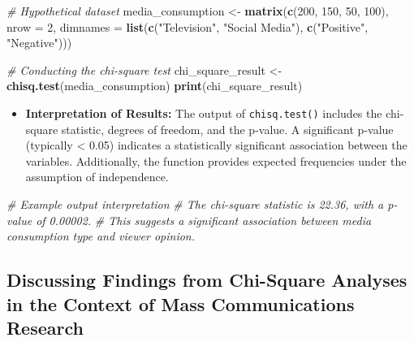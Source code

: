 \documentclass[
]{book}
\newenvironment{Shaded}{\begin{snugshade}}{\end{snugshade}}
\newcommand{\AttributeTok}[1]{\textcolor[rgb]{0.13,0.29,0.53}{#1}}
\newcommand{\CommentTok}[1]{\textcolor[rgb]{0.56,0.35,0.01}{\textit{#1}}}
\newcommand{\DecValTok}[1]{\textcolor[rgb]{0.00,0.00,0.81}{#1}}
\newcommand{\FunctionTok}[1]{\textcolor[rgb]{0.13,0.29,0.53}{\textbf{#1}}}
\newcommand{\NormalTok}[1]{#1}
\newcommand{\OtherTok}[1]{\textcolor[rgb]{0.56,0.35,0.01}{#1}}
\newcommand{\StringTok}[1]{\textcolor[rgb]{0.31,0.60,0.02}{#1}}
\providecommand{\tightlist}{%
  \setlength{\itemsep}{0pt}\setlength{\parskip}{0pt}}
\begin{document}
\begin{Shaded}
\begin{Highlighting}[]
\CommentTok{\# Hypothetical dataset}
\NormalTok{media\_consumption }\OtherTok{\textless{}{-}} \FunctionTok{matrix}\NormalTok{(}\FunctionTok{c}\NormalTok{(}\DecValTok{200}\NormalTok{, }\DecValTok{150}\NormalTok{, }\DecValTok{50}\NormalTok{, }\DecValTok{100}\NormalTok{), }\AttributeTok{nrow =} \DecValTok{2}\NormalTok{,}
                            \AttributeTok{dimnames =} \FunctionTok{list}\NormalTok{(}\FunctionTok{c}\NormalTok{(}\StringTok{"Television"}\NormalTok{, }\StringTok{"Social Media"}\NormalTok{),}
                                            \FunctionTok{c}\NormalTok{(}\StringTok{"Positive"}\NormalTok{, }\StringTok{"Negative"}\NormalTok{)))}

\CommentTok{\# Conducting the chi{-}square test}
\NormalTok{chi\_square\_result }\OtherTok{\textless{}{-}} \FunctionTok{chisq.test}\NormalTok{(media\_consumption)}
\FunctionTok{print}\NormalTok{(chi\_square\_result)}
\end{Highlighting}
\end{Shaded}

\begin{itemize}
\tightlist
\item
  \textbf{Interpretation of Results:} The output of \texttt{chisq.test()} includes the chi-square statistic, degrees of freedom, and the p-value. A significant p-value (typically \textless{} 0.05) indicates a statistically significant association between the variables. Additionally, the function provides expected frequencies under the assumption of independence.
\end{itemize}

\begin{Shaded}
\begin{Highlighting}[]
\CommentTok{\# Example output interpretation}
\CommentTok{\# The chi{-}square statistic is 22.36, with a p{-}value of 0.00002.}
\CommentTok{\# This suggests a significant association between media consumption type and viewer opinion.}
\end{Highlighting}
\end{Shaded}

\hypertarget{discussing-findings-from-chi-square-analyses-in-the-context-of-mass-communications-research}{%
\subsection*{Discussing Findings from Chi-Square Analyses in the Context of Mass Communications Research}\label{discussing-findings-from-chi-square-analyses-in-the-context-of-mass-communications-research}}
\end{document}
